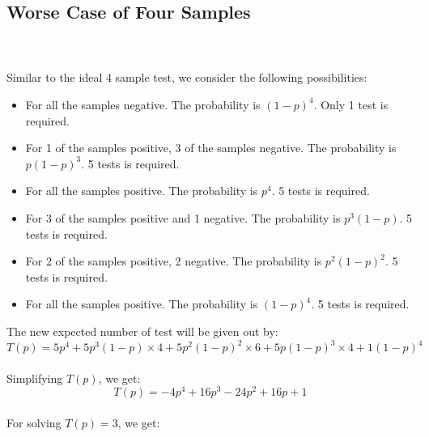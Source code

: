 \subsection*{Worse Case of Four Samples}
\\
\\
Similar to the ideal 4 sample test, we consider the following possibilities:

\begin{itemize}
  \item For all the samples negative. The probability is $(1-p)^4$. Only 1 test is required.
  \item For 1 of the samples positive, 3 of the samples negative. The probability is $p(1-p)^3$. 5 tests is required.
  \item For all the samples positive. The probability is $p^4$. 5 tests is required.
  \item For 3 of the samples positive and 1 negative. The probability is $p^3(1-p)$.  5 tests is required.
  \item For 2 of the samples positive, 2 negative. The probability is $p^2(1-p)^2$.  5 tests is required.
  \item For all the samples positive. The probability is $(1-p)^4$. 5 tests is required. 
\end{itemize}
The new expected number of test will be given out by:
\\
\begin{displaymath}
T(p)=5p^{4}+5p^{3}(1-p) \times 4+5 p^{2}(1-p)^{2} \times 6+5p(1-p)^{3} \times 4+1(1-p)^{4}
\end{displaymath}
\\
Simplifying $T(p)$, we get:
\\
\begin{displaymath}
T(p)=-4p^4+16p^3-24p^2+16p+1
\end{displaymath}
\\
For solving $T(p)=3$, we get:
\\
\begin{center}
\end{center}
